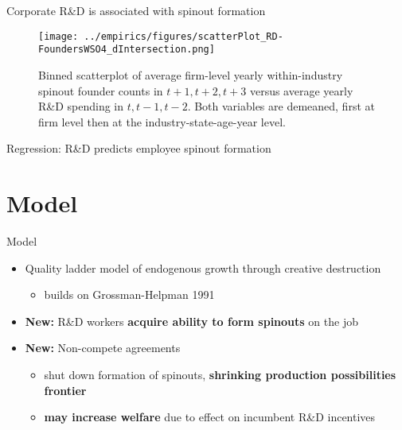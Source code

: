 \documentclass[english,usenames,dvipsnames]{beamer}
\begin{document}
\begin{frame}{Corporate R\&D is associated with spinout formation}
	\begin{figure}[!htb]
		\centering
		\texttt{[image: ../empirics/figures/scatterPlot\_RD-FoundersWSO4\_dIntersection.png]}
		\caption{\footnotesize Binned scatterplot of average firm-level yearly within-industry spinout founder counts in $t+1,t+2,t+3$ versus average yearly R\&D spending in $t,t-1,t-2$. Both variables are demeaned, first at firm level then at the industry-state-age-year level.}
	\end{figure}
\end{frame}

\begin{frame}{Regression: R\&D predicts employee spinout formation}
	\begin{table}
		\tiny
		\centering
		
		\caption{\scriptsize The dependent variable is average yearly number of founders joining WSOs in years $t+1,t+2,t+3$. The independent variables are averages over $t,t-1,t-2$. Firm controls include are employment, assets, intangible assets, investment, net income, cumulative citation-weighted patents, and Tobin's Q.}
	\end{table}
\end{frame}


\section{Model}

\begin{frame}
	\tableofcontents[currentsection]
\end{frame}

\begin{frame}{Model}
	\begin{itemize}	
		\item Quality ladder model of endogenous growth through creative destruction 
		\begin{itemize}
			\item builds on Grossman-Helpman 1991
		\end{itemize}
		\medskip
		\item \alert{\textbf{New:}} R\&D workers \textbf{\alert{acquire ability to form spinouts}} on the job
		\medskip
		\item \alert{\textbf{New:}} Non-compete agreements
		\begin{itemize}
			\item shut down formation of spinouts, \textbf{\alert{shrinking production possibilities frontier}}
			\item \textbf{\alert{may increase welfare}} due to effect on incumbent R\&D incentives
		\end{itemize}
	\end{itemize}
\end{frame}
\end{document}

